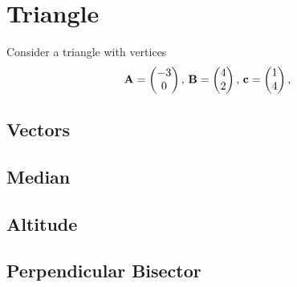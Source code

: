 \documentclass[11pt]{book}
\begin{document}
\frontmatter
\tableofcontents
\setcounter{page}{1}
\mainmatter
\chapter{Triangle}
Consider a triangle with vertices
\begin{align}
\label{eq:tri-pts}
\vec{A}=\myvec{-3 \\ 0},\,
\vec{B}=\myvec{4\\2},\,
	\vec{c}=\myvec{1\\4},\,
\end{align}

\section{Vectors}
\section{Median}
\section{Altitude}
\section{Perpendicular Bisector}
\end{document}
